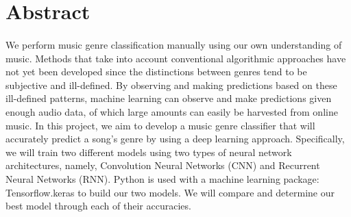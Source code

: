 \section{Abstract}
    \paragraph{}
    We perform music genre classification manually using our own understanding of music. Methods that take into account conventional algorithmic approaches have not yet been developed since the distinctions between genres tend to be subjective and ill-defined. By observing and making predictions based on these ill-defined patterns, machine learning can observe and make predictions given enough audio data, of which large amounts can easily be harvested from online music. In this project, we aim to develop a music genre classifier that will accurately predict a song's genre by using a deep learning approach. Specifically, we will train two different models using two types of neural network architectures, namely, Convolution Neural Networks (CNN) and Recurrent Neural Networks (RNN). Python is used with a machine learning package: Tensorflow.keras to build our two models. We will compare and determine our best model through each of their accuracies.
